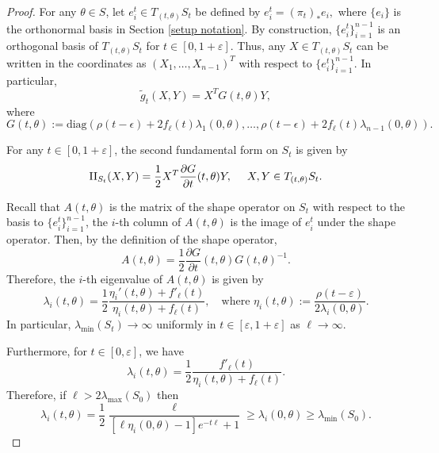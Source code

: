 \documentclass[10pt]{amsart}
\theoremstyle{definition}
\let\eps\varepsilon
\newcommand{\RomanNumeralCaps}[1]
{\MakeUppercase{\romannumeral #1}}
\newcommand{\II}{\textup{\RomanNumeralCaps{2}}}
\renewcommand{\>}{{\rangle}}
\newcommand{\<}{{\langle}}
\begin{document}
\begin{proof}
For any $\theta\in S$, let $e_i^t\in T_{(t,\theta)}S_t$ be defined by $e_i^t = (\pi_t)_{*}e_i,$ where $\{e_i\}$ is the orthonormal basis in Section \ref{setup notation}.
By construction, $\{e_i^t\}_{i=1}^{n-1}$ is an orthogonal basis of $T_{(t,\theta)}S_t$ for $t\in[0,1+\eps]$. Thus, any $X\in T_{(t,\theta)}S_t$ can be written in the coordinates as $(X_1,\ldots,X_{n-1})^T$ with respect to $\{e_i^t\}_{i=1}^{n-1}$. In particular,
\begin{equation*}
\tilde g_t(X,Y) = X^TG(t,\theta)Y,
\end{equation*}
where
\begin{equation*}
G(t,\theta):=\text{diag}(\rho(t-\epsilon)+2f_{\ell}(t)\lambda_1(0,\theta),\dots, \rho(t-\epsilon)+2f_{\ell}(t)\lambda_{n-1}(0,\theta)).
\end{equation*}

For any $t\in[0,1+\eps]$, the second fundamental form on $S_t$ is given by
\begin{equation*}
\II_{S_t}(X,Y)=\frac{1}{2}X^T\frac{\partial G}{\partial t} (t,\theta)Y,\quad \text{ } X,Y\in T_{(t,\theta)}S_t.
\end{equation*}

Recall that $A(t,\theta)$ is the matrix of the shape operator on $S_t$ with respect to the basis to $\{e_i^t\}_{i=1}^{n-1}$, \ie the $i$-th column of $A(t,\theta)$ is the image of $e_i^t$ under the shape operator. Then, by the definition of the shape operator,
\begin{equation*}
A(t,\theta) = \frac{1}{2}\frac{\partial G}{\partial t}(t,\theta)G(t,\theta)^{-1}.
\end{equation*}
Therefore, the $i$-th eigenvalue of $A(t,\theta)$ is given by
\begin{equation*}
\lambda_i(t,\theta) = \frac{1}{2}\frac{\eta_i'(t,\theta)+f'_{\ell}(t)}{\eta_i(t,\theta)+f_{\ell}(t)}, \quad \text{where } \eta_i(t,\theta):=\frac{\rho(t-\eps)}{2\lambda_i(0,\theta)}.
\end{equation*}
In particular, $\lambda_{\min}(S_t)\to\infty$ uniformly in $t\in[\eps,1+\eps]$ as $\ell\to\infty$.

Furthermore, for $t\in[0,\eps]$, we have
\begin{equation}\label{eqn: lambdai_t_0_ep}
\lambda_i(t,\theta) = \frac{1}{2} \frac{f'_{\ell}(t)}{\eta_i(t,\theta)+f_\ell(t)}.
\end{equation}
Therefore, if $\ell>2\lambda_{\max}(S_0)$ then
\[
\lambda_i(t,\theta)= \frac{1}{2}\frac{\ell}{[\ell\eta_i(0,\theta)-1]e^{-t\ell}+1}\geq \lambda_i(0,\theta)\geq\lambda_{\min}(S_0).
\]


\end{proof}
\end{document}
